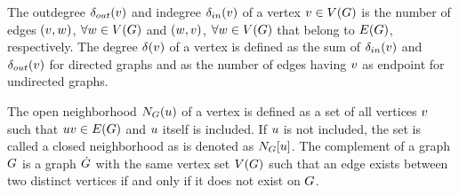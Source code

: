 \documentclass[msc,english,table,xcdraw]{ppgccufmg}
\begin{document}
The outdegree $\delta_{out}(v)$ and indegree $\delta_{in}(v)$ of a vertex 
$v \in V(G)$ is the number of edges $(v, 
w)$, $\forall w \in V(G)$ and $(w, 
v)$, $\forall w \in V(G)$ that belong to $E(G)$, 
respectively.
The degree $\delta(v)$ of a vertex is defined as the sum of 
$\delta_{in}(v)$ and $\delta_{out}(v)$ for directed graphs and as the number of edges having $v$ as endpoint for undirected graphs.


The open neighborhood $N_{G}(u)$ of a vertex is defined 
as a set of all vertices $v$ such that $uv \in E(G)$ and
$u$ itself is included.
If $u$ is not included, the set is called a closed neighborhood as is
denoted as $N_{G}[u]$.
The complement of a graph $G$ is a graph $\dot{G}$ with the same
vertex set $V(G)$ such that an edge exists between two distinct 
vertices if and only if it does not exist on $G$.


\end{document}
